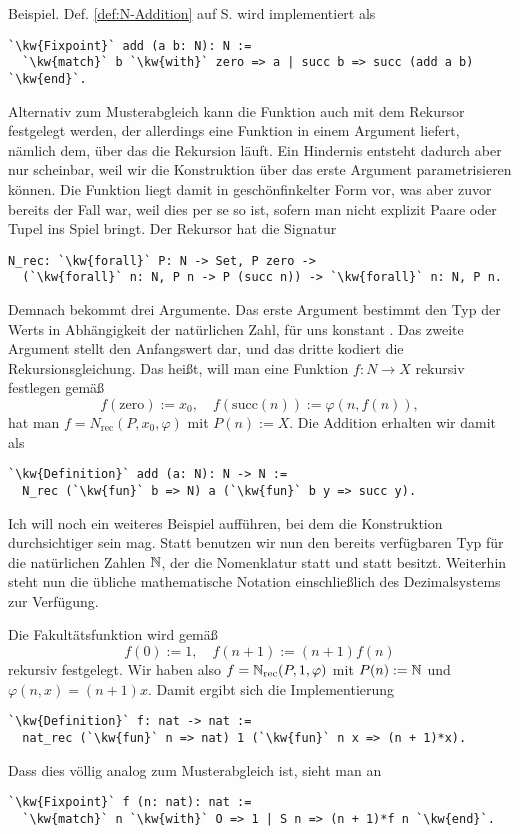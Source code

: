 Beispiel. Def. \ref{def:N-Addition} auf S. \pageref{def:N-Addition} wird
implementiert als
\begin{lstlisting}[escapechar=`, xleftmargin=\mathindent]
`\kw{Fixpoint}` add (a b: N): N :=
  `\kw{match}` b `\kw{with}` zero => a | succ b => succ (add a b) `\kw{end}`.
\end{lstlisting}
Alternativ zum Musterabgleich kann die Funktion auch mit dem Rekursor
 festgelegt werden, der allerdings eine Funktion in einem
Argument liefert, nämlich dem, über das die Rekursion läuft. Ein
Hindernis entsteht dadurch aber nur scheinbar, weil wir die Konstruktion
über das erste Argument  parametrisieren können. Die Funktion
 liegt damit in geschönfinkelter Form vor, was aber zuvor
bereits der Fall war, weil dies per se so ist, sofern man nicht explizit
Paare oder Tupel ins Spiel bringt. Der Rekursor hat die Signatur
\begin{lstlisting}[escapechar=`, xleftmargin=\mathindent]
N_rec: `\kw{forall}` P: N -> Set, P zero ->
  (`\kw{forall}` n: N, P n -> P (succ n)) -> `\kw{forall}` n: N, P n.
\end{lstlisting}
Demnach bekommt  drei Argumente. Das erste Argument
 bestimmt den Typ der Werts in Abhängigkeit der natürlichen
Zahl, für uns konstant . Das zweite Argument stellt den
Anfangswert dar, und das dritte kodiert die Rekursionsgleichung.
Das heißt, will man eine Funktion $f\colon N\to X$ rekursiv festlegen
gemäß
\[f(\mathrm{zero}) := x_0,\quad f(\mathrm{succ}(n)) := \varphi(n,f(n)),\]
hat man $f=N_\mathrm{rec}(P,x_0,\varphi)$ mit $P(n):=X$. Die Addition
erhalten wir damit als
\begin{lstlisting}[escapechar=`, xleftmargin=\mathindent]
`\kw{Definition}` add (a: N): N -> N :=
  N_rec (`\kw{fun}` b => N) a (`\kw{fun}` b y => succ y).
\end{lstlisting}
Ich will noch ein weiteres Beispiel aufführen, bei dem die Konstruktion
durchsichtiger sein mag. Statt  benutzen wir nun den bereits
verfügbaren Typ  für die natürlichen Zahlen $\mathbb N$, der die
Nomenklatur  statt  und  statt 
besitzt. Weiterhin steht nun die übliche mathematische Notation
einschließlich des Dezimalsystems zur Verfügung.

Die Fakultätsfunktion wird gemäß
\[f(0) := 1,\quad f(n+1) := (n+1)f(n)\]
rekursiv festgelegt. Wir haben also $f=\mathbb N_\mathrm{rec}(P,1,\varphi)$
mit $P(n):=\mathbb N$ und $\varphi(n,x)=(n+1)x$. Damit ergibt sich die
Implementierung
\begin{lstlisting}[escapechar=`, xleftmargin=\mathindent]
`\kw{Definition}` f: nat -> nat :=
  nat_rec (`\kw{fun}` n => nat) 1 (`\kw{fun}` n x => (n + 1)*x).
\end{lstlisting}
Dass dies völlig analog zum Musterabgleich ist, sieht man an
\begin{lstlisting}[escapechar=`, xleftmargin=\mathindent]
`\kw{Fixpoint}` f (n: nat): nat :=
  `\kw{match}` n `\kw{with}` O => 1 | S n => (n + 1)*f n `\kw{end}`.
\end{lstlisting}

